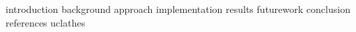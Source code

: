 \documentclass [MS] {uclathes}
\begin{document}
\makeintropages
 {introduction}
 {background}
 {approach}
 {implementation}
 {results}
 {futurework}
 {conclusion}
 {references}
 {uclathes}
\end{document}
